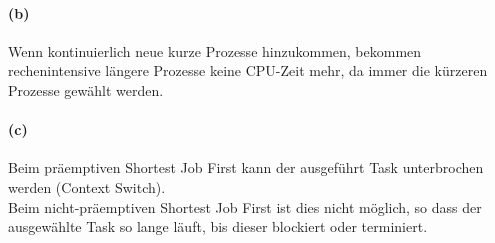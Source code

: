 \documentclass[a4paper]{article}
\begin{document}
\paragraph{(b)}
Wenn kontinuierlich neue kurze Prozesse hinzukommen, bekommen rechenintensive längere Prozesse keine CPU-Zeit mehr, da immer die kürzeren Prozesse gewählt werden.

\paragraph{(c)}
Beim präemptiven Shortest Job First kann der ausgeführt Task unterbrochen werden (Context Switch). \\
Beim nicht-präemptiven Shortest Job First ist dies nicht möglich, so dass der ausgewählte Task so lange läuft, bis dieser blockiert oder terminiert.
\end{document}
